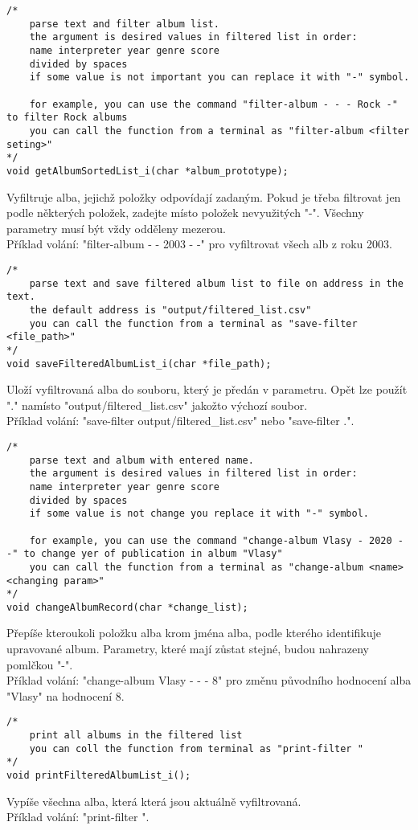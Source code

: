 \begin{lstlisting}[style=CStyle]
/*
    parse text and filter album list.
    the argument is desired values in filtered list in order:
    name interpreter year genre score
    divided by spaces
    if some value is not important you can replace it with "-" symbol.

    for example, you can use the command "filter-album - - - Rock -" to filter Rock albums
    you can call the function from a terminal as "filter-album <filter seting>"
*/
void getAlbumSortedList_i(char *album_prototype);
\end{lstlisting}
Vyfiltruje alba, jejichž položky odpovídají zadaným.
Pokud je třeba filtrovat jen podle některých položek, zadejte místo položek nevyužitých "-".
Všechny parametry musí být vždy odděleny mezerou.\\ 
Příklad volání: "filter-album - - 2003 - -" pro vyfiltrovat všech alb z roku 2003.

\begin{lstlisting}[style=CStyle]
/*
    parse text and save filtered album list to file on address in the text.
    the default address is "output/filtered_list.csv"
    you can call the function from a terminal as "save-filter <file_path>"
*/
void saveFilteredAlbumList_i(char *file_path);
\end{lstlisting}
Uloží vyfiltrovaná alba do souboru, který je předán v parametru.
Opět lze použít "." namísto "output/filtered\_list.csv" jakožto výchozí soubor.\\ 
Příklad volání: "save-filter output/filtered\_list.csv" nebo "save-filter .".
\newpage
\begin{lstlisting}[style=CStyle]
/*
    parse text and album with entered name.
    the argument is desired values in filtered list in order:
    name interpreter year genre score
    divided by spaces
    if some value is not change you replace it with "-" symbol.
    
    for example, you can use the command "change-album Vlasy - 2020 - -" to change yer of publication in album "Vlasy"
    you can call the function from a terminal as "change-album <name> <changing param>"
*/
void changeAlbumRecord(char *change_list);
\end{lstlisting}
Přepíše kteroukoli položku alba krom jména alba, podle kterého identifikuje upravované album.
Parametry, které mají zůstat stejné, budou nahrazeny pomlčkou "-".\\ 
Příklad volání: "change-album Vlasy - - - 8" pro změnu původního hodnocení alba "Vlasy" na hodnocení 8. 

\begin{lstlisting}[style=CStyle]
/*
    print all albums in the filtered list
    you can coll the function from terminal as "print-filter "
*/
void printFilteredAlbumList_i();
\end{lstlisting}
Vypíše všechna alba, která která jsou aktuálně vyfiltrovaná.\\ 
Příklad volání: "print-filter ". 